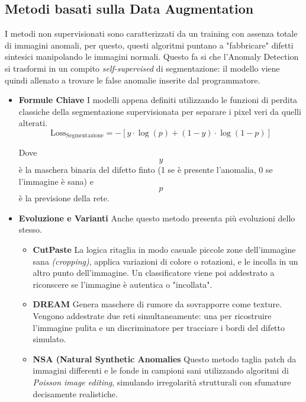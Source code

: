 \subsection{Metodi basati sulla Data Augmentation}

I metodi non supervisionati sono caratterizzati da un training con assenza totale di immagini anomali, per questo, questi algoritmi puntano a "fabbricare" difetti sintesici manipolando le immagini normali. Questo fa si che l'Anomaly Detection si trasformi in un compito \textit{self-supervised} di segmentazione: il modello viene quindi allenato a trovare le false anomalie inserite dal programmatore.\cite{Cui_et_al._2023}

\begin{itemize}
    \item \textbf{Formule Chiave}
    I modelli appena definiti utilizzando le funzioni di perdita classiche della segmentazione supervisionata per separare i pixel veri da quelli alterati.
    \[
    \text{Loss}_{\text{Segmentazione}} = - \left[ y \cdot \log(p) + (1 - y) \cdot \log(1 - p) \right]
    \]

    Dove \[y\] è la maschera binaria del difetto finto (1 se è presente l'anomalia, 0 se l'immagine è sana) e \[p\] è la previsione della rete.

    \item \textbf{Evoluzione e Varianti}
    Anche questo metodo presenta più evoluzioni dello stesso. 

    \begin{itemize}
        \item \textbf{CutPaste}
        La logica ritaglia in modo casuale piccole zone dell'immagine sana \textit{(cropping)}, applica variazioni di colore o rotazioni, e le incolla in un altro punto dell'immagine. Un classificatore viene poi addestrato a riconscere se l'immagine è autentica o "incollata".\cite{Cui_et_al._2023}

        \item \textbf{DREAM}
        Genera maschere di rumore da sovrapporre come texture. Vengono addestrate due reti simultaneamente: una per ricostruire l'immagine pulita e un discriminatore per tracciare i bordi del difetto simulato.

        \item \textbf{NSA (Natural Synthetic Anomalies}
        Questo metodo taglia patch da immagini differenti e le fonde in campioni sani utilizzando algoritmi di \textit{Poisson image editing}, simulando irregolarità strutturali con sfumature decisamente realistiche.
            
    \end{itemize}
\end{itemize}

